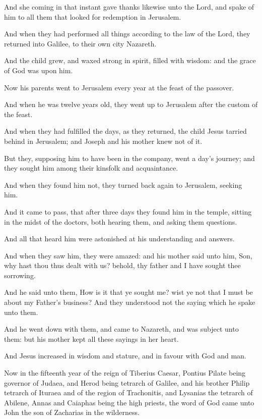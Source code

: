 \Verse And she coming in that instant gave thanks likewise unto the Lord, and spake of him to all them that looked for redemption in Jerusalem.

\Verse And when they had performed all things according to the law of the Lord, they returned into Galilee, to their own city Nazareth.

\Verse And the child grew, and waxed strong in spirit, filled with wisdom: and the grace of God was upon him.

\Verse Now his parents went to Jerusalem every year at the feast of the passover.

\Verse And when he was twelve years old, they went up to Jerusalem after the custom of the feast.

\Verse And when they had fulfilled the days, as they returned, the child Jesus tarried behind in Jerusalem; and Joseph and his mother knew not of it.

\Verse But they, supposing him to have been in the company, went a day's journey; and they sought him among their kinsfolk and acquaintance.

\Verse And when they found him not, they turned back again to Jerusalem, seeking him.

\Verse And it came to pass, that after three days they found him in the temple, sitting in the midst of the doctors, both hearing them, and asking them questions.

\Verse And all that heard him were astonished at his understanding and answers.

\Verse And when they saw him, they were amazed: and his mother said unto him, Son, why hast thou thus dealt with us? behold, thy father and I have sought thee sorrowing.

\Verse And he said unto them, How is it that ye sought me? wist ye not that I must be about my Father's business?  \Verse And they understood not the saying which he spake unto them.

\Verse And he went down with them, and came to Nazareth, and was subject unto them: but his mother kept all these sayings in her heart.

\Verse And Jesus increased in wisdom and stature, and in favour with God and man.


\Chapter
\Verse Now in the fifteenth year of the reign of Tiberius Caesar, Pontius Pilate being governor of Judaea, and Herod being tetrarch of Galilee, and his brother Philip tetrarch of Ituraea and of the region of Trachonitis, and Lysanias the tetrarch of Abilene, \Verse Annas and Caiaphas being the high priests, the word of God came unto John the son of Zacharias in the wilderness.

